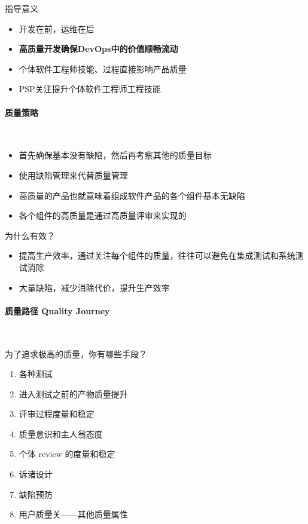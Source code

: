 指导意义
\vspace{-0.8em}
\begin{multicols}{2}
    \begin{itemize}
        \item 开发在前，运维在后
        \item \textbf{高质量开发确保DevOps中的价值顺畅流动}
        \item 个体软件工程师技能、过程直接影响产品质量
        \item PSP关注提升个体软件工程师工程技能
    \end{itemize}
\end{multicols}
\vspace{-1em}

\paragraph{质量策略}~{} \par
\vspace{-0.8em}
\begin{multicols}{2}
    \begin{itemize}
        \item 首先确保基本没有缺陷，然后再考察其他的质量目标
        \item 使用缺陷管理来代替质量管理
        \item 高质量的产品也就意味着组成软件产品的各个组件基本无缺陷
        \item 各个组件的高质量是通过高质量评审来实现的
    \end{itemize}
\end{multicols}
\vspace{-1em}

为什么有效？
\begin{itemize}
    \item 提高生产效率，通过关注每个组件的质量，往往可以避免在集成测试和系统测试消除
    \item 大量缺陷，减少消除代价，提升生产效率
\end{itemize}

\paragraph{质量路径 Quality Journey}~{} \par
为了追求极高的质量，你有哪些手段？
\vspace{-0.8em}
\begin{multicols}{2}
    \begin{enumerate}[label=\arabic*.]
        \item 各种测试
        \item 进入测试之前的产物质量提升
        \item 评审过程度量和稳定
        \item 质量意识和主人翁态度
        \item 个体 review 的度量和稳定
        \item 诉诸设计
        \item 缺陷预防
        \item 用户质量关——其他质量属性
    \end{enumerate}
\end{multicols}
\vspace{-1em}

